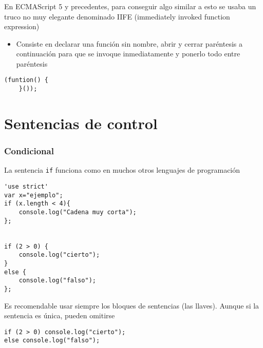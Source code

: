 \documentclass[ucs]{beamer}
\begin{document}
\begin{frame}[fragile]
\frametitle{}
En ECMAScript 5 y precedentes, para conseguir algo similar a esto se usaba
un truco no muy elegante denominado IIFE (immediately invoked function expression)


    \begin{itemize}
    \item
Consiste en declarar una función sin nombre, abrir y cerrar paréntesis a continuación para que se invoque
inmediatamente y ponerlo todo entre paréntesis
    \end{itemize}

  \begin{scriptsize}
  \begin{verbatim}
(funtion() {
    }());
  \end{verbatim}
  \end{scriptsize}

\end{frame}



\section{Sentencias de control}
\begin{frame}[fragile]
\frametitle{Condicional}

La sentencia \verb|if| funciona como en muchos otros
lenguajes de programación

  \begin{scriptsize}
  \begin{verbatim}
'use strict'
var x="ejemplo";
if (x.length < 4){
    console.log("Cadena muy corta");
};


if (2 > 0) {
    console.log("cierto");
}
else {
    console.log("falso");
};
  \end{verbatim}
  \end{scriptsize}

Es recomendable usar siempre los bloques de sentencias
(las llaves). Aunque si la sentencia es única, pueden omitirse

  \begin{scriptsize}
  \begin{verbatim}
if (2 > 0) console.log("cierto");
else console.log("falso");
  \end{verbatim}
  \end{scriptsize}

\end{frame}
\end{document}
